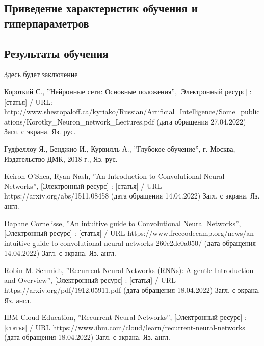 \documentclass[bachelor, och, coursework]{SCWorks}
\begin{document}
    \subsection{Приведение характеристик обучения и гиперпараметров}

    \subsection{Результаты обучения}

\conclusion

    Здесь будет заключение

\begin{thebibliography}{99}
     Короткий С., ''Нейронные сети: Основные положения'',
    [Электронный ресурс] : [статья] / URL:
    http://www.shestopaloff.ca/kyriako/Russian/Artificial_Intelligence/Some_publications/Korotky_Neuron_network_Lectures.pdf
    (дата обращения 27.04.2022) Загл. с экрана. Яз. рус.
    
     Гудфеллоу Я., Бенджио И., Курвилль А., ''Глубокое обучение'',
    г. Москва, Издательство ДМК, 2018 г., Яз. рус.
    

     Keiron O'Shea, Ryan Nash, ''An Introduction to Convolutional
    Neural Networks'', [Электронный ресурс] : [статья] / URL
    https://arxiv.org/abs/1511.08458 (дата обращения 14.04.2022) Загл. с экрана.
    Яз. англ.
    
     Daphne Cornelisse, ''An intuitive guide to Convolutional
    Neural Networks'', [Электронный ресурс] : [статья] / URL
    https://www.freecodecamp.org/news/an-intuitive-guide-to-convolutional-neural-networks-260c2de0a050/
    (дата обращения 14.04.2022) Загл. с экрана. Яз. англ.

    
     Robin M. Schmidt, ''Recurrent Neural Networks (RNNs): A
    gentle Introduction and Overview'', [Электронный ресурс] : [статья] / URL
    https://arxiv.org/pdf/1912.05911.pdf (дата обращения 18.04.2022) Загл. с
    экрана. Яз. англ.

     IBM Cloud Education, ''Recurrent Neural Networks'',
    [Электронный ресурс] : [статья] / URL
    https://www.ibm.com/cloud/learn/recurrent-neural-networks (дата обращения
    18.04.2022) Загл. с экрана. Яз. англ.


\end{thebibliography}
\end{document}
